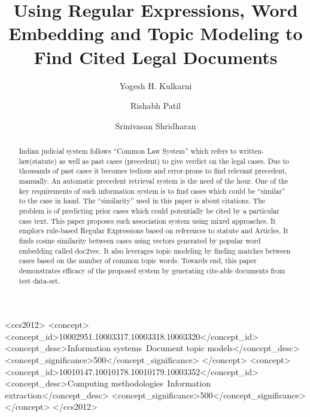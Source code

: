 \documentclass[sigconf]{acmart}
\begin{document}
\title{Using Regular Expressions, Word Embedding and Topic Modeling to Find Cited Legal Documents}


\author{Yogesh H. Kulkarni}

\author{Rishabh Patil}

\author{Srinivasan Shridharan}
\renewcommand{\shortauthors}{Yogesh Kulkarni et al.}


\begin{abstract}
Indian judicial system follows ``Common Law System'' which refers to written-law(statute) as well as past cases (precedent) to give verdict on the legal cases. Due to thousands of past cases it becomes tedious and error-prone to find relevant precedent, manually. An automatic precedent retrieval system is the need of the hour. One of the key requirements of such information system is to find cases which could be ``similar'' to the case in hand. The ``similarity'' used in this paper is about citations. The problem is of predicting prior cases which  could potentially be cited by a particular case text. This paper proposes such association system using mixed approaches. It employs rule-based Regular Expressions based on references to statute and Articles. It finds cosine similarity between cases using vectors generated by popular word embedding called doc2vec. It also leverages topic modeling by finding matches between cases based on the  number of common topic words. Towards end, this paper demonstrates efficacy of the proposed system by generating cite-able documents from test data-set.
\end{abstract}

%
%
 \begin{CCSXML}
<ccs2012>
<concept>
<concept_id>10002951.10003317.10003318.10003320</concept_id>
<concept_desc>Information systems~Document topic models</concept_desc>
<concept_significance>500</concept_significance>
</concept>
<concept>
<concept_id>10010147.10010178.10010179.10003352</concept_id>
<concept_desc>Computing methodologies~Information extraction</concept_desc>
<concept_significance>500</concept_significance>
</concept>
</ccs2012>
\end{CCSXML}
\end{document}
